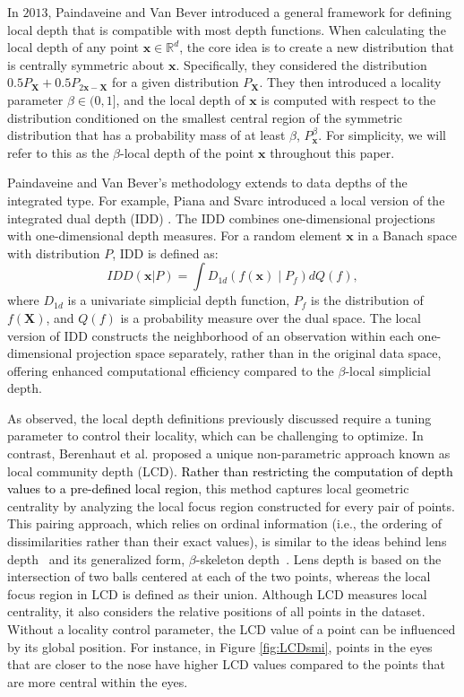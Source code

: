 \documentclass[final,3p,times]{elsarticle}
\newcommand{\vecx}{\mathbf{x}}
\newcommand{\vecX}{\mathbf{X}}
\begin{document}
In $2013$, Paindaveine and Van Bever \cite{paindaveine2013depth} introduced a general framework for defining local depth that is compatible with most depth functions. When calculating the local depth of any point $\vecx \in \mathbb{R}^d$, the core idea is to create a new distribution that is centrally symmetric about $\vecx$. Specifically, they considered the distribution $0.5P_\vecX + 0.5P_{2\vecx - \vecX}$ for a given distribution $P_\vecX$. They then introduced a locality parameter $\beta \in (0, 1]$, and the local depth of $\vecx$ is computed with respect to the distribution conditioned on the smallest central region of the symmetric distribution that has a probability mass of at least $\beta$, $P_{\vecx}^\beta$. For simplicity, we will refer to this as the $\beta$-local depth of the point $\vecx$ throughout this paper.

Paindaveine and Van Bever's methodology extends to data depths of the integrated type. For example, Piana and Svarc \cite{Piana2022} introduced a local version of the integrated dual depth (IDD) \cite{cuevas2009depth}. The IDD combines one-dimensional projections with one-dimensional depth measures. For a random element $\vecx$ in a Banach space with distribution $P$, IDD is defined as:
\begin{equation}
    IDD(\vecx| P) = \int D_{1d}(f(\vecx)\mid P_f) dQ(f),
\end{equation}
where $D_{1d}$ is a univariate simplicial depth function, $P_f$ is the distribution of $f(\vecX)$, and $Q(f)$ is a probability measure over the dual space. The local version of IDD constructs the neighborhood of an observation within each one-dimensional projection space separately, rather than in the original data space, offering enhanced computational efficiency compared to the $\beta$-local simplicial depth.

As observed, the local depth definitions previously discussed require a tuning parameter to control their locality, which can be challenging to optimize. In contrast, Berenhaut et al. \cite{berenhaut2022social} proposed a unique non-parametric approach known as local community depth (LCD). \textcolor{black}{Rather than restricting the computation of depth values to a pre-defined local region}, this method captures local geometric centrality by analyzing the local focus region constructed for every pair of points. This pairing approach, which relies on ordinal information (i.e., the ordering of dissimilarities rather than their exact values), is similar to the ideas behind lens depth~\cite{liu2011lens, kleindessner2017lens} and its generalized form, $\beta$-skeleton depth~\cite{mengta2018}. Lens depth is based on the intersection of two balls centered at each of the two points, whereas the local focus region in LCD is defined as their union. Although LCD measures local centrality, it also considers the relative positions of all points in the dataset. Without a locality control parameter, the LCD value of a point can be influenced by its global position. For instance, in Figure \ref{fig:LCDsmi}, points in the eyes that are closer to the nose have higher LCD values compared to the points that are more central within the eyes.
\end{document}
